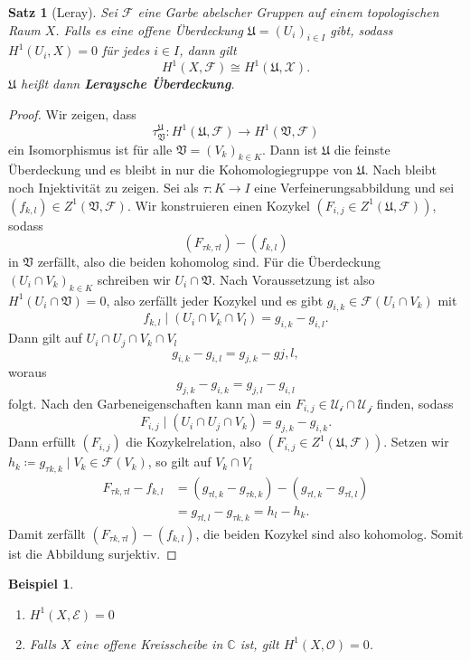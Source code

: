 \documentclass[11pt,a4paper]{scrartcl}
\theoremstyle{thm}
\newtheorem{satz}{Satz}[section]
\theoremstyle{def}
\newtheorem{bsp}{Beispiel}[section]
\theoremstyle{remark}
\begin{document}
\begin{satz}[Leray]
Sei $\mathcal{F}$ eine Garbe abelscher Gruppen auf einem topologischen Raum $X$. Falls es eine offene Überdeckung $\mathfrak{U}=(U_i)_{i\in I}$ gibt, sodass $H^1(U_i,X)=0$ für jedes $i\in I$, dann gilt
\[
H^1(X,\mathcal{F})\cong H^1(\mathfrak{U},\mathcal{X}).
\]
$\mathfrak{U}$ heißt dann \textbf{Leraysche Überdeckung}.
\end{satz}
\begin{proof}
	Wir zeigen, dass
	\[\tau_{\mathfrak{V}}^{\mathfrak{U}}:H^1(\mathfrak{U},\mathcal{F})\rightarrow H^1(\mathfrak{V},\mathcal{F})\]
	ein Isomorphismus ist für alle $\mathfrak{V}=(V_k)_{k\in K}$. Dann ist $\mathfrak{U}$ die feinste Überdeckung und es bleibt in  nur die Kohomologiegruppe von $\mathfrak{U}$. Nach  bleibt noch Injektivität zu zeigen.
	Sei als $\tau : K\rightarrow I$ eine Verfeinerungsabbildung und sei $(f_{k,l})\in Z^1(\mathfrak{V},\mathcal{F}).$ Wir konstruieren einen Kozykel $(F_{i,j}\in Z^1(\mathfrak{U},\mathcal{F}))$, sodass \[(F_{\tau k,\tau l})-(f_{k,l})\]
	in $\mathfrak{V}$ zerfällt, also die beiden kohomolog sind.
	Für die Überdeckung $(U_i\cap V_k)_{k\in K}$ schreiben wir $U_i\cap\mathfrak{V}$. Nach Voraussetzung ist also $H^1(U_i\cap \mathfrak{V})=0$, also zerfällt jeder Kozykel und es gibt $g_{i,k}\in\mathcal{F}(U_i\cap V_k)$ mit
	\[f_{k,l}\mid (U_i\cap V_k\cap V_l)=g_{i,k}-g_{i,l}.
	\]
	Dann gilt auf $U_i\cap U_j\cap V_k\cap V_l$
	\[g_{i,k}-g_{i,l}=g_{j,k}-g{j,l},
	\]
	woraus
	\[g_{j,k}-g_{i,k}=g_{j,l}-g_{i,l}
	\]
	folgt. Nach den Garbeneigenschaften kann man ein $F_{i,j}\in\mathcal{U_i\cap U_j}$ finden, sodass
	\[F_{i,j}\mid(U_i\cap U_j\cap V_k)= g_{j,k}-g_{i,k}.
	\]
	Dann erfüllt $(F_{i,j})$ die Kozykelrelation, also $(F_{i,j}\in Z^1(\mathfrak{U},\mathcal{F}))$.
	Setzen wir $h_{k}\coloneqq g_{\tau k, k}\mid V_k \in \mathcal{F}(V_k)$, so gilt auf $V_k\cap V_l$
	\begin{align*}
		F_{\tau k,\tau l} -f_{k,l}&=(g_{\tau l,k}-g_{\tau k,k})-(g_{\tau l,k}-g_{\tau l,l})\\
		&=g_{\tau l,l}-g_{\tau k, k}=h_l-h_k.
	\end{align*}
	Damit zerfällt $(F_{\tau k,\tau l})-(f_{k,l})$, die beiden Kozykel sind also kohomolog. Somit ist die Abbildung surjektiv.
\end{proof}

\begin{bsp}
\begin{enumerate}
    \item
    $H^1(X,\mathcal{E})=0$ \cite[~S.92,12.6]{forster}
    \item
    Falls $X$ eine offene Kreisscheibe in $\mathbb{C}$ ist, gilt $H^1(X,\mathcal{O})=0$. \cite[S.98,13.4]{forster}
\end{enumerate}
\end{bsp}
\end{document}
